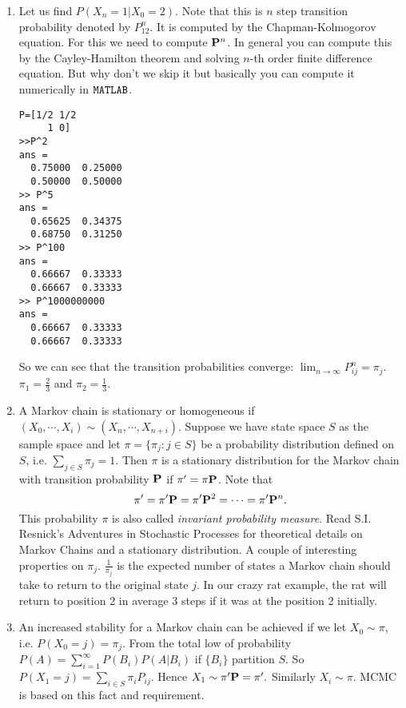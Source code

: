 \documentclass[12pt,twocolumn]{article} %
\begin{document}
\begin{enumerate}
\item Let us find $P(X_n=1|X_0=2)$. Note that this is $n$ step transition probability denoted by $P_{12}^n$. It is computed by the Chapman-Kolmogorov equation. For this we need to compute ${\bf P}^n$. In general you can compute this by the Cayley-Hamilton theorem and solving $n$-th order finite difference equation. But why don't we skip it but basically you can compute it numerically in $\tt{MATLAB}$.
\begin{verbatim}
P=[1/2 1/2
     1 0]
>>P^2
ans =
  0.75000  0.25000
  0.50000  0.50000 
>> P^5
ans =
  0.65625  0.34375
  0.68750  0.31250
>> P^100
ans =
  0.66667  0.33333
  0.66667  0.33333
>> P^1000000000
ans =
  0.66667  0.33333
  0.66667  0.33333
\end{verbatim}
So we can see that the transition probabilities converge: $\lim_{n \to \infty} P_{ij}^{n} =\pi_j$. $\pi_1=\frac{2}{3}$ and $\pi_2=\frac{1}{3}$.
\item A Markov chain is stationary or homogeneous if $(X_0,\cdots,X_i) \sim (X_n,\cdots,X_{n+i})$. Suppose we have state space $S$ as the sample space and let $\pi =\{\pi_j: j \in S\}$ be a probability distribution defined on $S$, i.e. $\sum _{j \in S} \pi_j =1$. Then $\pi$ is a stationary distribution for the Markov chain with transition probability ${\bf P}$ if $\pi' = \pi{\bf P}$. Note that
$$\pi' = \pi'{\bf P} = \pi'{\bf P}^2 = \cdots = \pi'{\bf P}^n.$$
This probability $\pi$ is also called {\em invariant probability measure}. Read S.I. Resnick's Adventures in Stochastic Processes for theoretical details on Markov Chains and a stationary distribution.
A couple of interesting properties on $\pi_j$. $\frac{1}{\pi_j}$ is the expected number of states a Markov chain should take to return to the original state $j$. In our crazy rat example, the rat will return to position 2 in average 3 steps if it was at the position 2 initially.

\item An increased stability for a Markov chain can be achieved if we let $X_0 \sim \pi$, i.e. $P(X_0=j) = \pi_j$. From the total low of probability
$P(A)=\sum_{i=1}^{\infty} P(B_i)P(A|B_i)$ if $\{ B_i \}$ partition $S$.
So $P(X_1=j) = \sum_{i \in S} \pi_i P_{ij}$. Hence $X_1 \sim \pi'{\bf P} =\pi'.$
Similarly $X_i \sim \pi$. MCMC is based on this fact and requirement.

\end{enumerate}
\end{document}
